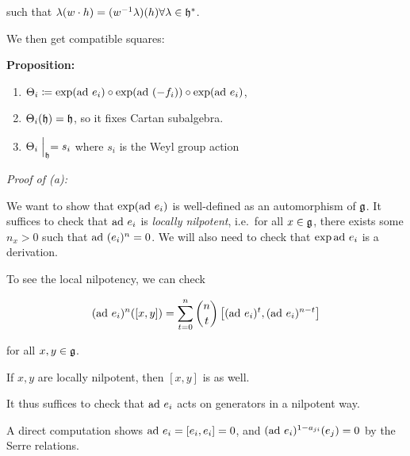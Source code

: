 such that
\(\lambda(w\cdot h) = (w^{-1} \lambda ) (h) \forall \lambda \in {\mathfrak{h}}^*\).

We then get compatible squares:

\begin{center}
\end{center}

\textbf{Proposition:}

\begin{enumerate}
\def\labelenumi{\alph{enumi}.}
\tightlist
\item
  \(\Theta_i \coloneqq \exp(\mathrm{ad}~ e_i) \circ \exp(\mathrm{ad}~ (-f_i)) \circ \exp(\mathrm{ad}~ e_i)\),
\item
  \(\Theta_i({\mathfrak{h}}) = {\mathfrak{h}}\), so it fixes Cartan subalgebra.
\item
  \(\Theta_i\mathrel{\Big|}_{\mathfrak{h}} = s_i\) where \(s_i\) is the Weyl group action
\end{enumerate}

\emph{Proof of (a):}

We want to show that \(\exp(\mathrm{ad}~ e_i)\) is well-defined as an
automorphism of \({\mathfrak{g}}\). It suffices to check that \(\mathrm{ad}~ e_i\) is
\emph{locally nilpotent}, i.e.~for all \(x\in {\mathfrak{g}}\), there exists some
\(n_x > 0\) such that \(\mathrm{ad}~(e_i)^n = 0\). We will also need to check
that \(\exp \mathrm{ad}~ e_i\) is a derivation.

To see the local nilpotency, we can check

\begin{align*}
(\mathrm{ad}~ e_i)^n([x, y]) = \sum_{t=0}^n {n \choose t} \left[ (\mathrm{ad}~ e_i)^t, (\mathrm{ad}~ e_i)^{n-t} \right]
\end{align*}

for all \(x, y \in {\mathfrak{g}}\).

If \(x,y\) are locally nilpotent, then \([x, y]\) is as well.

It thus suffices to check that \(\mathrm{ad}~ e_i\) acts on generators in a
nilpotent way.

A direct computation shows \(\mathrm{ad}~ e_i = [e_i, e_i] = 0\), and
\((\mathrm{ad}~ e_i)^{1 - a_{ji}}(e_j) = 0\) by the Serre relations.

